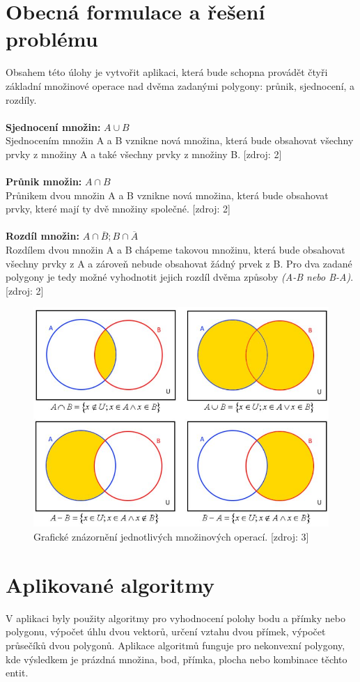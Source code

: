 \documentclass[a4paper, 12pt]{article}
\begin{document}
\section{Obecná formulace a řešení problému}
Obsahem této úlohy je vytvořit aplikaci, která bude schopna provádět čtyři základní množinové operace nad dvěma zadanými polygony: průnik, sjednocení, a rozdíly.\\
\\
\textbf{Sjednocení množin:} $ A \cup B $\\ Sjednocením množin A a B vznikne nová množina, která bude obsahovat všechny prvky z množiny A a také všechny prvky z množiny B. [zdroj: 2]\\
\\
\textbf{Průnik množin:} $ A \cap B $\\ Průnikem dvou množin A a B vznikne nová množina, která bude obsahovat prvky, které mají ty dvě množiny společné. [zdroj: 2]\\
\\
\textbf{Rozdíl množin:} $ A \cap \overline{B} ; B \cap \overline{A} $\\ Rozdílem dvou množin A a B chápeme takovou množinu, která bude obsahovat všechny prvky z A a zároveň nebude obsahovat žádný prvek z B. Pro dva zadané polygony je tedy možné vyhodnotit jejich rozdíl dvěma způsoby \textit{(A-B nebo B-A)}. [zdroj: 2]

\begin{figure}[h!]
	\centering
	\includegraphics[width=12cm]{mnozinove_operace.jpg}
	\caption{Grafické znázornění jednotlivých množinových operací. [zdroj: 3]}
\end{figure}

\section{Aplikované algoritmy}
V aplikaci byly použity algoritmy pro vyhodnocení polohy bodu a přímky nebo polygonu, výpočet úhlu dvou vektorů, určení vztahu dvou přímek, výpočet průsečíků dvou polygonů. Aplikace algoritmů funguje pro nekonvexní polygony, kde výsledkem je prázdná množina, bod, přímka, plocha nebo kombinace těchto entit. 
\end{document}
